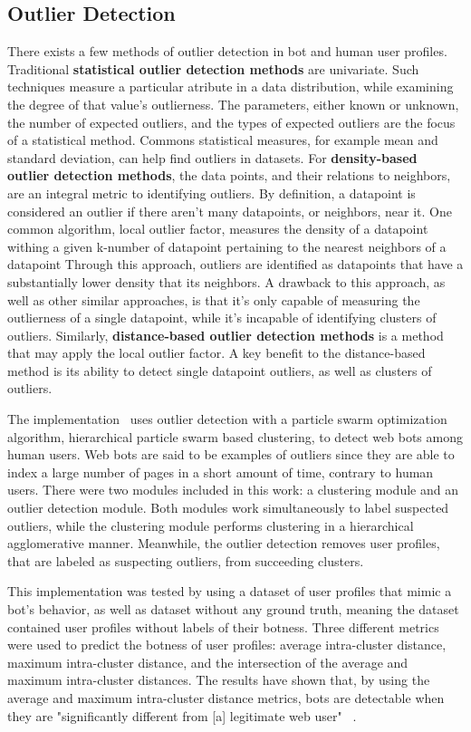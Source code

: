 \subsection{Outlier Detection}\label{subsec:outlier-detection}
There exists a few methods of outlier detection in bot and human user profiles.
Traditional \textbf{statistical outlier detection methods} are univariate.
Such techniques measure a particular atribute in a data distribution, while examining the degree of that value's outlierness.
The parameters, either known or unknown, the number of expected outliers, and the types of expected outliers are the focus of a statistical method.
Commons statistical measures, for example mean and standard deviation, can help find outliers in datasets.
For \textbf{density-based outlier detection methods}, the data points, and their relations to neighbors, are an integral metric to identifying outliers.
By definition, a datapoint is considered an outlier if there aren't many datapoints, or neighbors, near it.
One common algorithm, local outlier factor, measures the density of a datapoint withing a given k-number of datapoint pertaining to the nearest neighbors of a datapoint
Through this approach, outliers are identified as datapoints that have a substantially lower density that its neighbors.
A drawback to this approach, as well as other similar approaches, is that it's only capable of measuring the outlierness of a single datapoint, while it's incapable of identifying clusters of outliers.
Similarly, \textbf{distance-based outlier detection methods} is a method that may apply the local outlier factor.
A key benefit to the distance-based method is its ability to detect single datapoint outliers, as well as clusters of outliers.

The implementation~\cite{particle_swarm} uses outlier detection with a particle swarm optimization algorithm, hierarchical particle swarm based clustering, to detect web bots among human users.
Web bots are said to be examples of outliers since they are able to index a large number of pages in a short amount of time, contrary to human users.
There were two modules included in this work: a clustering module and an outlier detection module.
Both modules work simultaneously to label suspected outliers, while the clustering module performs clustering in a hierarchical agglomerative manner.
Meanwhile, the outlier detection removes user profiles, that are labeled as suspecting outliers, from succeeding clusters.

This implementation was tested by using a dataset of user profiles that mimic a bot's behavior, as well as dataset without any ground truth, meaning the dataset contained user profiles without labels of their botness.
Three different metrics were used to predict the botness of user profiles: average intra-cluster distance, maximum intra-cluster distance, and the intersection of the average and maximum intra-cluster distances.
The results have shown that, by using the average and maximum intra-cluster distance metrics, bots are detectable when they are "significantly different from [a] legitimate web user" ~\cite{particle_swarm}.

